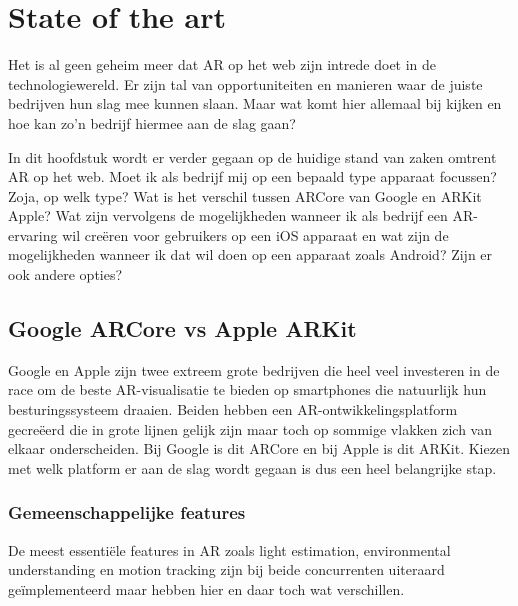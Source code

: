 \chapter{State of the art}
\label{ch:stand-van-zaken}



Het is al geen geheim meer dat AR op het web zijn intrede doet in de technologiewereld. Er zijn tal van opportuniteiten en manieren waar de juiste bedrijven hun slag mee kunnen slaan. Maar wat komt hier allemaal bij kijken en hoe kan zo'n bedrijf hiermee aan de slag gaan? 

In dit hoofdstuk wordt er verder gegaan op de huidige stand van zaken omtrent AR op het web. Moet ik als bedrijf mij op een bepaald type apparaat focussen? Zoja, op welk type? Wat is het verschil tussen ARCore van Google en ARKit Apple? Wat zijn vervolgens de mogelijkheden wanneer ik als bedrijf een AR-ervaring wil creëren voor gebruikers op een iOS apparaat en wat zijn de mogelijkheden wanneer ik dat wil doen op een apparaat zoals Android? Zijn er ook andere opties?

\section{Google ARCore vs Apple ARKit}
\label{sec:google-arcore-vs-apple-arkit}

Google en Apple zijn twee extreem grote bedrijven die heel veel investeren in de race om de beste AR-visualisatie te bieden op smartphones die natuurlijk hun besturingssysteem draaien. Beiden hebben een AR-ontwikkelingsplatform gecreëerd die in grote lijnen gelijk zijn maar toch op sommige vlakken zich van elkaar onderscheiden. Bij Google is dit ARCore en bij Apple is dit ARKit. Kiezen met welk platform er aan de slag wordt gegaan is dus een heel belangrijke stap. 

\subsection{Gemeenschappelijke features}

De meest essentiële features in AR zoals light estimation, environmental understanding en motion tracking zijn bij beide concurrenten uiteraard geïmplementeerd maar hebben  hier en daar toch wat verschillen. 

